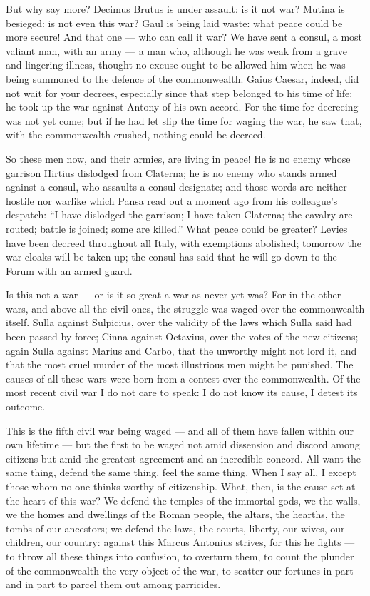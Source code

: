  But why say more? Decimus Brutus is under assault: is it not war? Mutina is besieged: is not even this war? Gaul is being laid waste: what peace could be more secure! And that one --- who can call it war? We have sent a consul, a most valiant man, with an army --- a man who, although he was weak from a grave and lingering illness, thought no excuse ought to be allowed him when he was being summoned to the defence of the commonwealth. Gaius Caesar, indeed, did not wait for your decrees, especially since that step belonged to his time of life: he took up the war against Antony of his own accord. For the time for decreeing was not yet come; but if he had let slip the time for waging the war, he saw that, with the commonwealth crushed, nothing could be decreed.

 So these men now, and their armies, are living in peace! He is no enemy whose garrison Hirtius dislodged from Claterna; he is no enemy who stands armed against a consul, who assaults a consul-designate; and those words are neither hostile nor warlike which Pansa read out a moment ago from his colleague's despatch: ``I have dislodged the garrison; I have taken Claterna; the cavalry are routed; battle is joined; some are killed.'' What peace could be greater? Levies have been decreed throughout all Italy, with exemptions abolished; tomorrow the war-cloaks will be taken up; the consul has said that he will go down to the Forum with an armed guard.

 Is this not a war --- or is it so great a war as never yet was? For in the other wars, and above all the civil ones, the struggle was waged over the commonwealth itself. Sulla against Sulpicius, over the validity of the laws which Sulla said had been passed by force; Cinna against Octavius, over the votes of the new citizens; again Sulla against Marius and Carbo, that the unworthy might not lord it, and that the most cruel murder of the most illustrious men might be punished. The causes of all these wars were born from a contest over the commonwealth. Of the most recent civil war I do not care to speak: I do not know its cause, I detest its outcome.

 This is the fifth civil war being waged --- and all of them have fallen within our own lifetime --- but the first to be waged not amid dissension and discord among citizens but amid the greatest agreement and an incredible concord. All want the same thing, defend the same thing, feel the same thing. When I say all, I except those whom no one thinks worthy of citizenship. What, then, is the cause set at the heart of this war? We defend the temples of the immortal gods, we the walls, we the homes and dwellings of the Roman people, the altars, the hearths, the tombs of our ancestors; we defend the laws, the courts, liberty, our wives, our children, our country: against this Marcus Antonius strives, for this he fights --- to throw all these things into confusion, to overturn them, to count the plunder of the commonwealth the very object of the war, to scatter our fortunes in part and in part to parcel them out among parricides.

